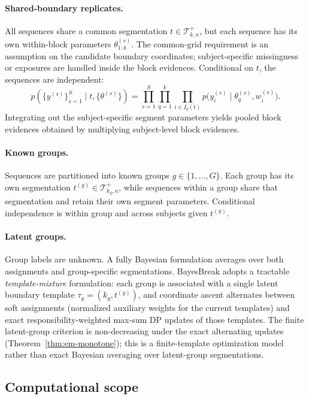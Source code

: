 \paragraph{Shared-boundary replicates.}
All sequences share a common segmentation $t\in\mathcal{T}^{+}_{k,n}$, but each sequence has its
own within-block parameters $\theta^{(s)}_{1:k}$. The common-grid requirement is an assumption on
the candidate boundary coordinates; subject-specific missingness or exposures are handled inside
the block evidences. Conditional on $t$, the sequences are independent:
\begin{equation}
p(\{y^{(s)}\}_{s=1}^S\mid t,\{\theta^{(s)}\})
= \prod_{s=1}^S \prod_{q=1}^k \prod_{i\in I_q(t)} p\bigl(y_i^{(s)}\mid \theta_q^{(s)}, w_i^{(s)}\bigr).
\end{equation}
Integrating out the subject-specific segment parameters yields pooled block evidences obtained by
multiplying subject-level block evidences.

\paragraph{Known groups.}
Sequences are partitioned into known groups $g\in\{1,\dots,G\}$. Each group has its own
segmentation $t^{(g)}\in\mathcal{T}^{+}_{k_g,n}$, while sequences within a group share that
segmentation and retain their own segment parameters. Conditional independence is within group
and across subjects given $t^{(g)}$.

\paragraph{Latent groups.}
Group labels are unknown. A fully Bayesian formulation averages over both
assignments and group-specific segmentations. BayesBreak adopts a tractable
\emph{template-mixture} formulation: each group is associated with a single latent boundary
template $\tau_g=(k_g,t^{(g)})$, and coordinate ascent alternates between soft assignments (normalized auxiliary weights for the current
templates) and exact responsibility-weighted max-sum DP updates of those templates. The
finite latent-group criterion is non-decreasing under the exact alternating updates
(Theorem~\ref{thm:em-monotone}); this is a finite-template optimization model rather than exact Bayesian
averaging over latent-group segmentations.

\subsection{Computational scope}
\label{sec:problem-computation}

